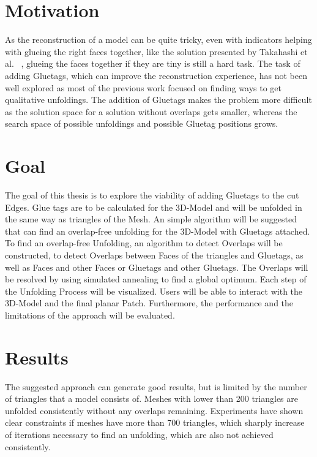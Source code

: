 \documentclass[draft,final]{vutinfth} %
\begin{document}
\section{Motivation}
As the reconstruction of a model can be quite tricky, even with indicators helping with glueing the right faces together, like the solution presented by Takahashi et al.
~\cite{takahashi2011optimized}, glueing the faces together if they are tiny is still a hard task.
The task of adding Gluetags, which can improve the reconstruction experience, has not been well explored as most of the previous work focused on finding ways to get qualitative unfoldings. The addition of Gluetags makes the problem more difficult as the solution space for a solution without overlaps gets smaller, whereas the search space of possible unfoldings and possible Gluetag positions grows.

\section{Goal}
The goal of this thesis is to explore the viability of adding Gluetags to the cut Edges. Glue tags are to be calculated for the 3D-Model and will be unfolded in the same way as triangles of the Mesh. An simple algorithm will be suggested that can find an overlap-free unfolding for the 3D-Model with Gluetags attached. To find an overlap-free Unfolding, an algorithm to detect Overlaps will be constructed, to detect Overlaps between Faces of the triangles and Gluetags, as well as Faces and other Faces or Gluetags and other Gluetags.
The Overlaps will be resolved by using simulated annealing to find a global optimum. Each step of the Unfolding Process will be visualized. Users will be able to interact with the 3D-Model and the final planar Patch. Furthermore, the performance and the limitations of the approach will be evaluated.

\section{Results}
The suggested approach can generate good results, but is limited by the number of triangles that a model consists of. Meshes with lower than 200 triangles are unfolded consistently without any overlaps remaining. Experiments have shown clear constraints if meshes have more than 700 triangles, which sharply increase of iterations necessary to find an unfolding, which are also not achieved consistently.
\end{document}
